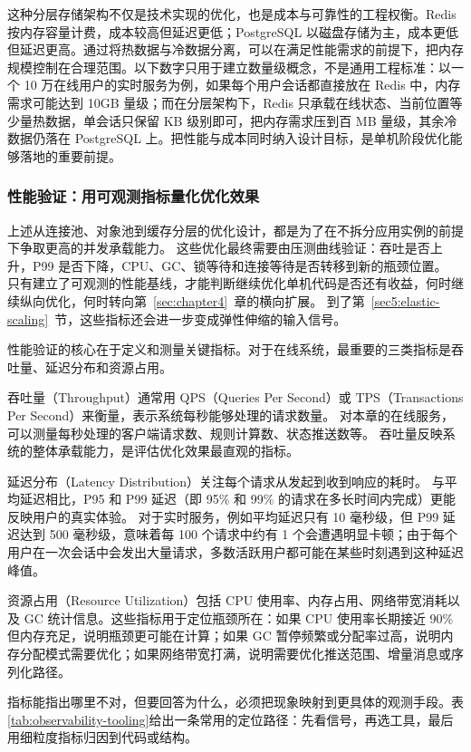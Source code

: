 这种分层存储架构不仅是技术实现的优化，也是成本与可靠性的工程权衡。Redis 按内存容量计费，成本较高但延迟更低；PostgreSQL 以磁盘存储为主，成本更低但延迟更高。通过将热数据与冷数据分离，可以在满足性能需求的前提下，把内存规模控制在合理范围。以下数字只用于建立数量级概念，不是通用工程标准：以一个 10 万在线用户的实时服务为例，如果每个用户会话都直接放在 Redis 中，内存需求可能达到 10GB 量级；而在分层架构下，Redis 只承载在线状态、当前位置等少量热数据，单会话只保留 KB 级别即可，把内存需求压到百 MB 量级，其余冷数据仍落在 PostgreSQL 上。把性能与成本同时纳入设计目标，是单机阶段优化能够落地的重要前提。

\subsubsection{性能验证：用可观测指标量化优化效果}\label{sec3:performance-validation}

上述从连接池、对象池到缓存分层的优化设计，都是为了在不拆分应用实例的前提下争取更高的并发承载能力。
这些优化最终需要由压测曲线验证：吞吐是否上升，P99 是否下降，CPU、GC、锁等待和连接等待是否转移到新的瓶颈位置。
只有建立了可观测的性能基线，才能判断继续优化单机代码是否还有收益，何时继续纵向优化，何时转向第~\ref{sec:chapter4}~章的横向扩展。
到了第~\ref{sec5:elastic-scaling}~节，这些指标还会进一步变成弹性伸缩的输入信号。

性能验证的核心在于定义和测量关键指标。对于在线系统，最重要的三类指标是吞吐量、延迟分布和资源占用。

吞吐量（Throughput）通常用 QPS（Queries Per Second）或 TPS（Transactions Per Second）来衡量，表示系统每秒能够处理的请求数量。
对本章的在线服务，可以测量每秒处理的客户端请求数、规则计算数、状态推送数等。
吞吐量反映系统的整体承载能力，是评估优化效果最直观的指标。

延迟分布（Latency Distribution）关注每个请求从发起到收到响应的耗时。
与平均延迟相比，P95 和 P99 延迟（即 95\% 和 99\% 的请求在多长时间内完成）更能反映用户的真实体验。
对于实时服务，例如平均延迟只有 10 毫秒级，但 P99 延迟达到 500 毫秒级，意味着每 100 个请求中约有 1 个会遭遇明显卡顿；由于每个用户在一次会话中会发出大量请求，多数活跃用户都可能在某些时刻遇到这种延迟峰值。

资源占用（Resource Utilization）包括 CPU 使用率、内存占用、网络带宽消耗以及 GC 统计信息。这些指标用于定位瓶颈所在：如果 CPU 使用率长期接近 90\% 但内存充足，说明瓶颈更可能在计算；如果 GC 暂停频繁或分配率过高，说明内存分配模式需要优化；如果网络带宽打满，说明需要优化推送范围、增量消息或序列化路径。

指标能指出哪里不对，但要回答为什么，必须把现象映射到更具体的观测手段。表\ref{tab:observability-tooling}给出一条常用的定位路径：先看信号，再选工具，最后用细粒度指标归因到代码或结构。

